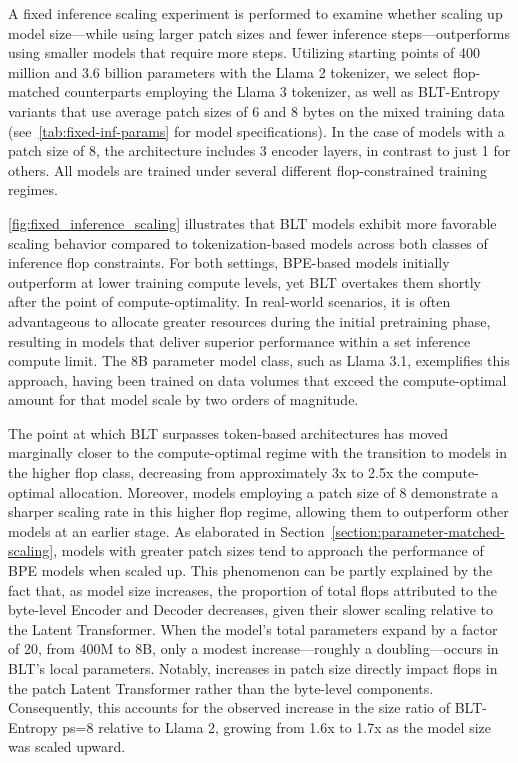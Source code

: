 A fixed inference scaling experiment is performed to examine whether scaling up model size—while using larger patch sizes and fewer inference steps—outperforms using smaller models that require more steps. Utilizing starting points of 400 million and 3.6 billion parameters with the Llama 2 tokenizer, we select flop-matched counterparts employing the Llama 3 tokenizer, as well as {\textsc BLT}-Entropy variants that use average patch sizes of 6 and 8 bytes on the mixed training data (see~\autoref{tab:fixed-inf-params} for model specifications). In the case of models with a patch size of 8, the architecture includes 3 encoder layers, in contrast to just 1 for others. All models are trained under several different flop-constrained training regimes.

\autoref{fig:fixed_inference_scaling} illustrates that {\textsc BLT} models exhibit more favorable scaling behavior compared to tokenization-based models across both classes of inference flop constraints. For both settings, BPE-based models initially outperform at lower training compute levels, yet {\textsc BLT} overtakes them shortly after the point of compute-optimality. In real-world scenarios, it is often advantageous to allocate greater resources during the initial pretraining phase, resulting in models that deliver superior performance within a set inference compute limit. The 8B parameter model class, such as Llama 3.1, exemplifies this approach, having been trained on data volumes that exceed the compute-optimal amount for that model scale by two orders of magnitude.

The point at which {\textsc BLT} surpasses token-based architectures has moved marginally closer to the compute-optimal regime with the transition to models in the higher flop class, decreasing from approximately 3x to 2.5x the compute-optimal allocation. Moreover, models employing a patch size of 8 demonstrate a sharper scaling rate in this higher flop regime, allowing them to outperform other models at an earlier stage. As elaborated in Section~\ref{section:parameter-matched-scaling}, models with greater patch sizes tend to approach the performance of BPE models when scaled up. This phenomenon can be partly explained by the fact that, as model size increases, the proportion of total flops attributed to the byte-level Encoder and Decoder decreases, given their slower scaling relative to the Latent Transformer. When the model’s total parameters expand by a factor of 20, from 400M to 8B, only a modest increase—roughly a doubling—occurs in {\textsc BLT}’s local parameters. Notably, increases in patch size directly impact flops in the patch Latent Transformer rather than the byte-level components. Consequently, this accounts for the observed increase in the size ratio of {\textsc BLT}-Entropy ps=8 relative to Llama 2, growing from 1.6x to 1.7x as the model size was scaled upward.

